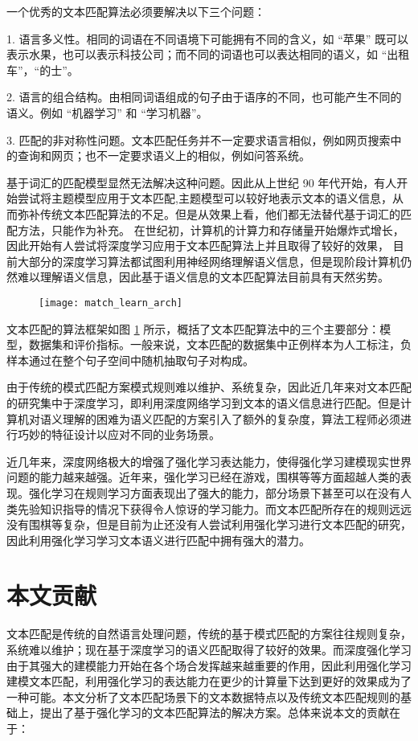 一个优秀的文本匹配算法必须要解决以下三个问题：

1. 语言多义性。相同的词语在不同语境下可能拥有不同的含义，如 “苹果” 既可以表示水果，也可以表示科技公司；而不同的词语也可以表达相同的语义，如 “出租车”，“的士”。

2. 语言的组合结构。由相同词语组成的句子由于语序的不同，也可能产生不同的语义。例如 “机器学习” 和 “学习机器”。

3. 匹配的非对称性问题。文本匹配任务并不一定要求语言相似，例如网页搜索中的查询和网页；也不一定要求语义上的相似，例如问答系统。

基于词汇的匹配模型显然无法解决这种问题。因此从上世纪 90 年代开始，有人开始尝试将主题模型应用于文本匹配,主题模型可以较好地表示文本的语义信息，从而弥补传统文本匹配算法的不足。但是从效果上看，他们都无法替代基于词汇的匹配方法，只能作为补充。
在世纪初，计算机的计算力和存储量开始爆炸式增长，因此开始有人尝试将深度学习应用于文本匹配算法上并且取得了较好的效果，
目前大部分的深度学习算法都试图利用神经网络理解语义信息，但是现阶段计算机仍然难以理解语义信息，因此基于语义信息的文本匹配算法目前具有天然劣势。

\begin{figure}[!htbp]
    \centering
    \texttt{[image: match\_learn\_arch]}
    \label{fig:match_learn_arch}
\end{figure}

文本匹配的算法框架如图 \ref{fig:match_learn_arch} 所示，概括了文本匹配算法中的三个主要部分：模型，数据集和评价指标。一般来说，文本匹配的数据集中正例样本为人工标注，负样本通过在整个句子空间中随机抽取句子对构成。

由于传统的模式匹配方案模式规则难以维护、系统复杂，因此近几年来对文本匹配的研究集中于深度学习，即利用深度网络学习到文本的语义信息进行匹配。但是计算机对语义理解的困难为语义匹配的方案引入了额外的复杂度，算法工程师必须进行巧妙的特征设计以应对不同的业务场景。

近几年来，深度网络极大的增强了强化学习表达能力，使得强化学习建模现实世界问题的能力越来越强。近年来，强化学习已经在游戏，围棋等等方面超越人类的表现。强化学习在规则学习方面表现出了强大的能力，部分场景下甚至可以在没有人类先验知识指导的情况下获得令人惊讶的学习能力。而文本匹配所存在的规则远远没有围棋等复杂，但是目前为止还没有人尝试利用强化学习进行文本匹配的研究，因此利用强化学习学习文本语义进行匹配中拥有强大的潜力。

\section{本文贡献}
文本匹配是传统的自然语言处理问题，传统的基于模式匹配的方案往往规则复杂，系统难以维护；现在基于深度学习的语义匹配取得了较好的效果。而深度强化学习由于其强大的建模能力开始在各个场合发挥越来越重要的作用，因此利用强化学习建模文本匹配，利用强化学习的表达能力在更少的计算量下达到更好的效果成为了一种可能。本文分析了文本匹配场景下的文本数据特点以及传统文本匹配规则的基础上，提出了基于强化学习的文本匹配算法的解决方案。总体来说本文的贡献在于：

